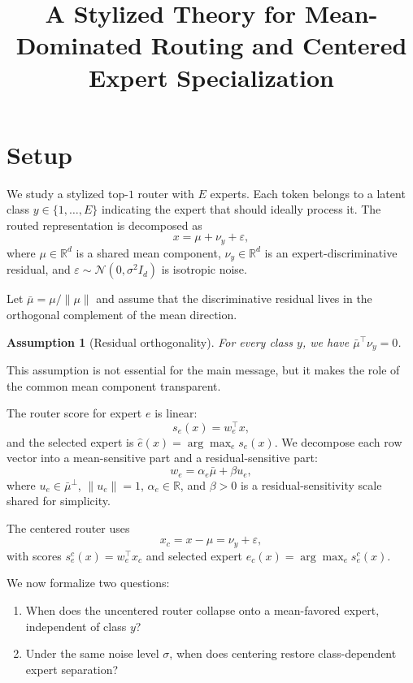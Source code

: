 \documentclass[11pt]{article}
\title{A Stylized Theory for Mean-Dominated Routing and Centered Expert Specialization}
\author{}
\date{}
\newtheorem{assumption}{Assumption}
\begin{document}
\maketitle

\section{Setup}

We study a stylized top-$1$ router with $E$ experts. Each token belongs to a latent class $y\in\{1,\dots,E\}$ indicating the expert that should ideally process it. The routed representation is decomposed as
\begin{equation}
    x = \mu + \nu_y + \varepsilon,
\end{equation}
where $\mu\in\mathbb R^d$ is a shared mean component, $\nu_y\in\mathbb R^d$ is an expert-discriminative residual, and $\varepsilon\sim\mathcal N(0,\sigma^2 I_d)$ is isotropic noise.

Let $\bar\mu = \mu / \|\mu\|$ and assume that the discriminative residual lives in the orthogonal complement of the mean direction.
\begin{assumption}[Residual orthogonality]
For every class $y$, we have $\bar\mu^\top \nu_y = 0$.
\end{assumption}
This assumption is not essential for the main message, but it makes the role of the common mean component transparent.

The router score for expert $e$ is linear:
\begin{equation}
    s_e(x) = w_e^\top x,
\end{equation}
and the selected expert is $\hat e(x)=\arg\max_e s_e(x)$. We decompose each row vector into a mean-sensitive part and a residual-sensitive part:
\begin{equation}
    w_e = \alpha_e \bar\mu + \beta u_e,
\end{equation}
where $u_e\in\bar\mu^\perp$, $\|u_e\|=1$, $\alpha_e\in\mathbb R$, and $\beta>0$ is a residual-sensitivity scale shared for simplicity.

The centered router uses
\begin{equation}
    x_c = x-\mu = \nu_y + \varepsilon,
\end{equation}
with scores $s^c_e(x)=w_e^\top x_c$ and selected expert $\hat e_c(x)=\arg\max_e s^c_e(x)$.

We now formalize two questions:
\begin{enumerate}
    \item When does the uncentered router collapse onto a mean-favored expert, independent of class $y$?
    \item Under the same noise level $\sigma$, when does centering restore class-dependent expert separation?
\end{enumerate}
\end{document}

